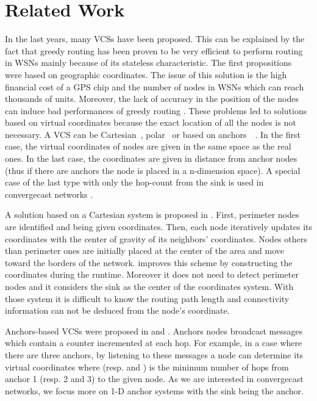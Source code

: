 \documentclass[a4paper]{article}
\begin{document}
\section{Related Work}
In the last years, many VCSs have been proposed. This can be explained by the fact that greedy routing has been proven to be very efficient to perform routing in WSNs mainly because of its stateless characteristic. The first propositions~\cite{Karp00} \cite{Bose99} were based on geographic coordinates. The issue of this solution is the high financial cost of a GPS chip and the number of nodes in WSNs which can reach thousands of units. Moreover, the lack of accuracy in the position of the nodes can induce bad performances of greedy routing \cite{Watteyne07}. These problems led to solutions based on virtual coordinates because the exact location of all the nodes is not necessary. A VCS can be Cartesian~\cite{Rao03}, polar~\cite{Newsome03} or based on anchors~\cite{Caruso05}~\cite{Cao04}. In the first case, the virtual coordinates of nodes are given in the same space as the real ones. In the last case, the coordinates are given in distance from anchor nodes (thus if there are  anchors the node is placed in a n-dimension space). A special case of the last type with only the hop-count from the sink is used in convergecast networks \cite{Ye05}.

A solution based on a Cartesian system is proposed in \cite{Rao03}. First,  perimeter nodes are identified and being given coordinates. Then, each node iteratively updates its coordinates with the center of gravity of its neighbors' coordinates. Nodes others than perimeter ones are initially placed at the center of the area and move toward the borders of the network. \cite{Watteyne09} improves this scheme by constructing the coordinates during the runtime. Moreover it does not need to detect perimeter nodes and it considers the sink as the center of the coordinates system. With those system it is difficult to know the routing path length and connectivity information can not be deduced from the node's coordinate. 

Anchors-based VCSs were proposed in \cite{Caruso05} and \cite{Cao04}. Anchors nodes broadcast messages which contain a counter incremented at each hop. For example, in a case where there are three anchors, by listening to these messages a node can determine its virtual coordinates  where  (resp.  and ) is the minimum number of hops from anchor 1 (resp. 2 and 3) to the given node. As we are interested in convergecast networks, we focus more on 1-D anchor systems with the sink being the anchor.
\end{document}

